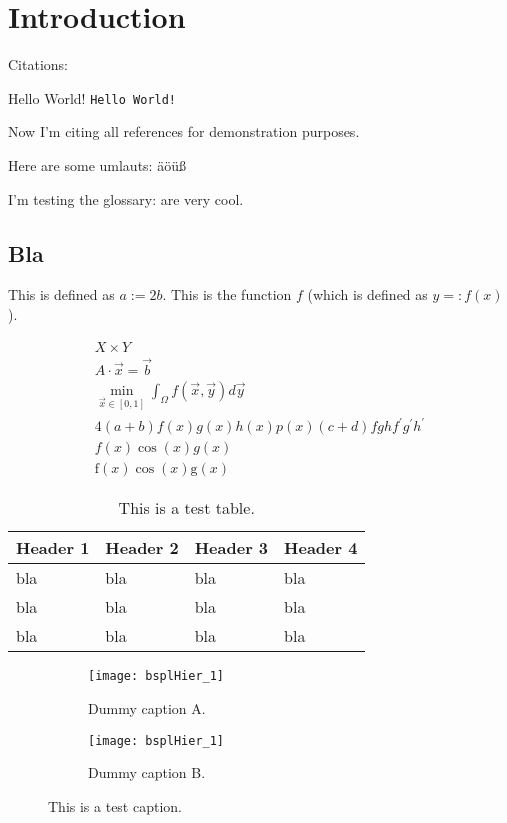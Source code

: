 
\chapter{Introduction}


Citations:
\cite{Boor72Calculating}

Hello World! \texttt{Hello World!}

Now I'm citing all references for demonstration purposes.
\nocite{*}

Here are some umlauts: äöüß

I'm testing the glossary:
\nurbs are very cool.

\section{Bla}

This is defined as $a := 2b$.
This is the function $f$ (which is defined as $y =: f(x)$).

\begin{gather}
  X \times Y\\
  A \cdot \vec{x} = \vec{b}\\
  \min_{\vec{x} \in [0, 1]} \int_\Omega f(\vec{x}, \vec{y}) d\vec{y}\\
  4(a+b)f(x)g(x)h(x)p(x)(c+d)fghf^\prime g^\prime h^\prime\\
  f(x)\cos(x)g(x)\\
  \mathrm{f}(x)\cos(x)\mathrm{g}(x)
\end{gather}

\begin{table}
  \begin{tabular}{llll}
    \toprule
    \textbf{Header 1}&\textbf{Header 2}&\textbf{Header 3}&\textbf{Header 4}\\
    \midrule
    bla&bla&bla&bla\\
    bla&bla&bla&bla\\
    bla&bla&bla&bla\\
    \bottomrule
  \end{tabular}
  \caption{This is a test table.}
  \label{tbl:test}
\end{table}

\begin{figure}
  \begin{subfigure}{65mm}
    \texttt{[image: bsplHier\_1]}
    \caption{Dummy caption A.}
    \label{fig:test1a}
  \end{subfigure}
  \hspace{3mm}
  \begin{subfigure}{65mm}
    \texttt{[image: bsplHier\_1]}
    \caption{Dummy caption B.}
    \label{fig:test1b}
  \end{subfigure}
  \caption{This is a test caption.}
  \label{fig:test1}
\end{figure}

